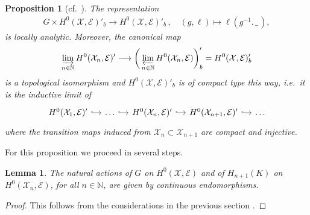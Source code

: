 \documentclass[a4paper, reqno, 10pt]{amsart}
\newtheorem{proposition}[theorem]{Proposition}
\newtheorem{lemma}[theorem]{Lemma}
\theoremstyle{definition}
\numberwithin{equation}{section}
\newcommand{\blank}{{\,\_\,}}
\newcommand{\lra}{\longrightarrow}
\newcommand{\lto}{\longmapsto}
\newcommand{\BN}{{\mathbb {N}}}
\newcommand{\CE}{{\mathcal {E}}}
\newcommand{\CX}{{\mathcal {X}}}
\begin{document}
\begin{proposition}[{cf.\ \cite[Cor.\ 3.9]{SchneiderTeitelbaum02pAdicBoundVal}}]\label{Prop 2 - Dual of the sections on DHS is locally analytic representation}
	The representation
	\begin{align}\label{Eq 2 - Representation on dual of global sections}
		G \times H^0(\CX,\CE)'_b \lra H^0(\CX,\CE)'_b \,,\quad (g,\ell) \lto \ell(g^{-1}. \blank) ,
	\end{align}
	is locally analytic.
	Moreover, the canonical map
	\begin{align}\label{Eq 2 - Dual of projective limit of sections}
		\varinjlim_{n\in \BN} H^0(\CX_n,\CE)' \lra  \bigg (\varprojlim_{n\in\BN} H^0(\CX_n,\CE) \bigg)_b' = H^0(\CX,\CE)_b'
	\end{align}
	is a topological isomorphism and $H^0(\CX,\CE)'_b$ is of compact type this way, i.e.\ it is the inductive limit of 
	\begin{equation}\label{Eq 2 - Dual of sections is of compact type}
		\begin{tikzcd}[column sep = small]
			H^0(\CX_1,\CE)' \ar[r, hook] &  \ldots \ar[r, hook] & H^0(\CX_n,\CE)' \ar[r, hook] & H^0(\CX_{n+1},\CE)' \ar[r, hook] & \ldots
		\end{tikzcd}
	\end{equation}
	where the transition maps induced from $\CX_n \subset \CX_{n+1}$ are compact and injective.
\end{proposition}


For this proposition we proceed in several steps.





\begin{lemma}\label{Lemma 2 - Continuity of action on sections of DHS}
	The natural actions of $G$ on $H^0(\CX,\CE)$ and of $H_{n+1}(K)$ on $H^0(\CX_n,\CE)$, for all $n\in \BN$, are given by continuous endomorphisms.
\end{lemma}
\begin{proof}
	This follows from the considerations in the previous section .
\end{proof}	
\end{document}
